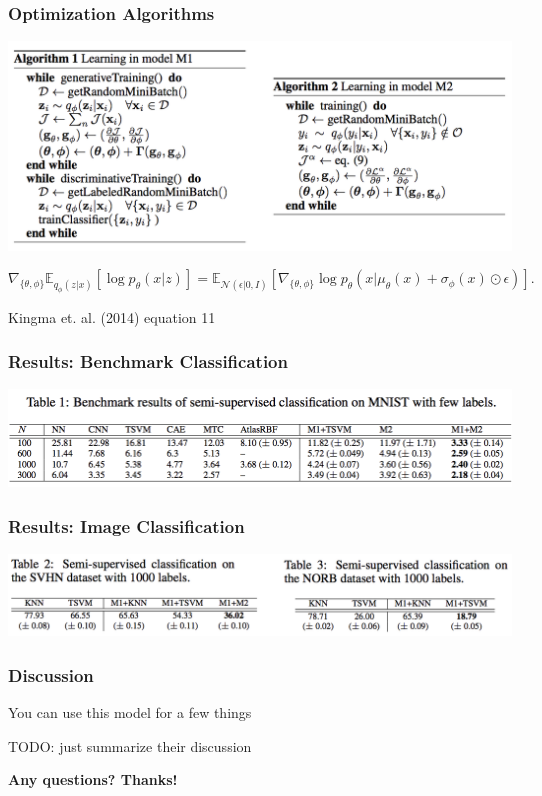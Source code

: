 \documentclass{beamer}
\begin{document}
\begin{frame}
  \frametitle{Optimization Algorithms}
  \includegraphics[scale=0.5]{learningModel}

    \[
  \nabla_{\{\theta, \phi\}} \mathbb{E}_{q_\phi (z|x)}
        [\log p_\theta (x|z)] = \mathbb{E}_{\mathcal{N}(\epsilon | 0, I)}
        [\nabla_{\{\theta, \phi\}} \log p_\theta (x |\mu_\theta (x)
          + \sigma_\phi (x) \odot \epsilon)]. 
        \]

        Kingma et. al. (2014) equation 11

\end{frame}

\begin{frame}
  \frametitle{Results: Benchmark Classification}

  \includegraphics[scale=0.5]{table1}
  
\end{frame}
\begin{frame}
  \frametitle{Results: Image Classification}

  \includegraphics[scale=0.5]{table2and3}
\end{frame}

\begin{frame}
  \frametitle{Discussion}

  You can use this model for a few things

  TODO: just summarize their discussion
\end{frame}

\begin{frame}
  \textbf{Any questions? Thanks!}
  \end{frame}


 
\end{document}
